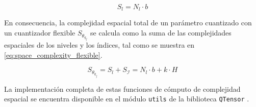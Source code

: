 \begin{equation}
  \label{eq:space_complexity_flexible_levels}
    S_{l} = N_{l} \cdot b
\end{equation}

En consecuencia, la complejidad espacial total de un parámetro cuantizado con un cuantizador flexible $S_{\theta_{q_{f}}}$ se calcula como la suma de las complejidades espaciales de los niveles y los índices, tal como se muestra en \eqref{eq:space_complexity_flexible}.

\begin{equation}
  \label{eq:space_complexity_flexible}
    S_{\theta_{q_{f}}} = S_{l} + S_{\mathcal{I}} = N_{l} \cdot b + k \cdot H
\end{equation}

La implementación completa de estas funciones de cómputo de complejidad espacial se encuentra disponible en el módulo \texttt{utils} de la biblioteca \texttt{QTensor} \cite{qtensor_metrics}.
